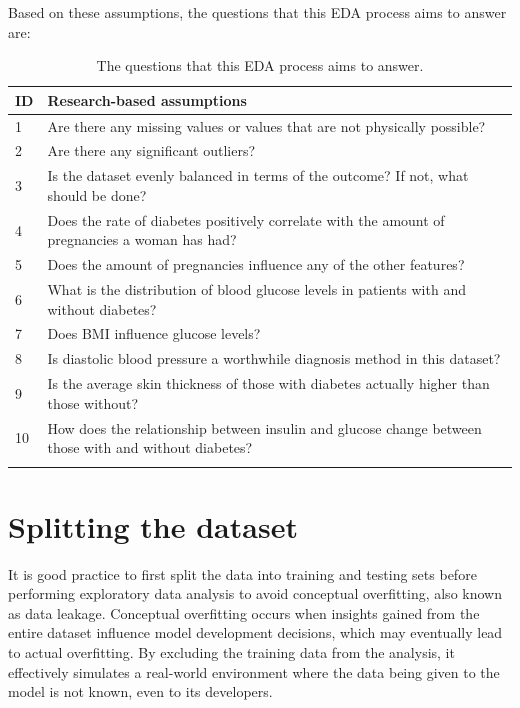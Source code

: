 \documentclass[12pt]{report}
\newcommand{\para}{\vspace{8pt}\noindent}
\begin{document}
\para Based on these assumptions, the questions that this EDA process aims to answer are:


\begin{longtable}{ | p{} | p{} | }
    \hline
    \cellcolor{blue!25} ID & \cellcolor{blue!25} Research-based assumptions \\
    \hline
    1 & Are there any missing values or values that are not physically possible?\\
    \hline
    2 & Are there any significant outliers?\\
    \hline 
    3 & Is the dataset evenly balanced in terms of the outcome? If not, what should be done?\\
    \hline 
    4 & Does the rate of diabetes positively correlate with the amount of pregnancies a woman has had?\\
    \hline
    5 & Does the amount of pregnancies influence any of the other features?\\
    \hline
    6 & What is the distribution of blood glucose levels in patients with and without diabetes?\\
    \hline
    7 & Does BMI influence glucose levels?\\
    \hline
    8 & Is diastolic blood pressure a worthwhile diagnosis method in this dataset?\\
    \hline
    9 & Is the average skin thickness of those with diabetes actually higher than those without?\\
    \hline
    10 & How does the relationship between insulin and glucose change between those with and without diabetes?\\
    \hline
    \caption{The questions that this EDA process aims to answer.}\label{tab:Questions}
\end{longtable}

\section{Splitting the dataset}
It is good practice to first split the data into training and testing sets before performing exploratory data analysis
to avoid conceptual overfitting, also known as data leakage. Conceptual overfitting occurs when insights gained from the entire dataset 
influence model development decisions, which may eventually lead to actual overfitting. By excluding the training data from the analysis,
it effectively simulates a real-world environment where the data being given to the model is not known, even to its developers.
\end{document}
